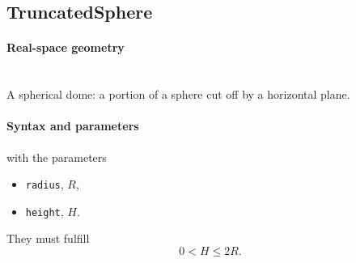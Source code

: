 \clearpage
\subsection{TruncatedSphere}\label{sec:TruncatedSphere}
  
\paragraph{Real-space geometry}\strut\\
A spherical dome: a portion of a sphere cut off by a horizontal plane.

\begin{figure}[h]
\hfill
{}
\hfill
{}
\hfill
{}
\hfill
\end{figure}
\FloatBarrier

\paragraph{Syntax and parameters}
\begin{quote}
\end{quote}
with the parameters
\begin{itemize}
\item \texttt{radius}, $R$,
\item \texttt{height}, $H$.
\end{itemize}
They must fulfill
\begin{displaymath}
   0 < H\leq 2R.
\end{displaymath}


